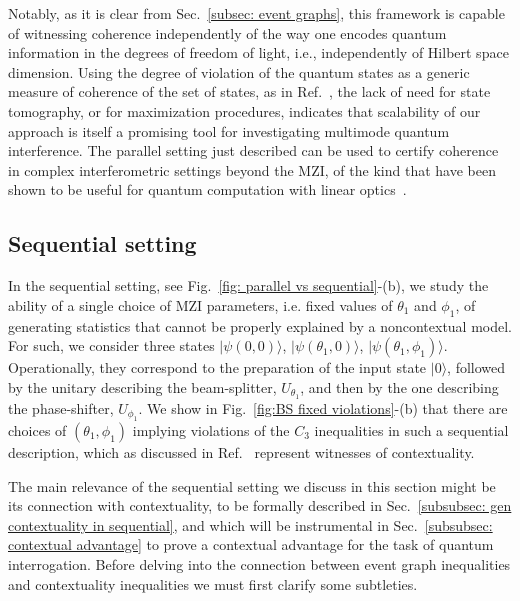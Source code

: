 \documentclass[a4paper,twocolumn,11pt,accepted=2024-01-17]{quantumarticle}
\begin{document}
Notably, as it is clear from Sec.~\ref{subsec: event graphs}, this framework is capable of witnessing coherence independently of the way one encodes quantum information in the degrees of freedom of light, i.e., independently of Hilbert space dimension. Using the degree of violation of the quantum states as a generic measure of coherence of the set of states, as in Ref.~\cite{giordani2020experimental}, the lack of need for state tomography, or for maximization procedures, indicates that scalability of our approach is itself a promising tool for investigating multimode quantum interference. { The parallel setting just described can be used to certify coherence in complex interferometric settings beyond the MZI, of the kind that have been shown to be useful for quantum computation with linear optics~\cite{taballione2021universal}.}

\subsection{Sequential setting}\label{subsec: sequential setting}

In the sequential setting, see Fig.~\ref{fig: parallel vs sequential}-(b), we study the ability of a single choice of MZI parameters, i.e. fixed values of $\theta_1$ and $\phi_1$, of generating statistics that cannot be properly explained by a noncontextual model. For such, we consider three states $\vert \psi(0,0) \rangle$, $\vert \psi(\theta_1,0)\rangle$, $\vert \psi(\theta_1,\phi_1)\rangle$. Operationally, they correspond to the preparation of the input state $\vert 0 \rangle$, followed by the unitary describing the beam-splitter, $U_{\theta_1}$, and then by the one describing the phase-shifter, $U_{\phi_1}$. We show in Fig.~\ref{fig:BS fixed violations}-(b) that there are choices of $(\theta_1,\phi_1)$ implying violations of the $C_3$ inequalities { in such a sequential description}, which as discussed in Ref.~\cite{wagner2022inequalities} represent witnesses of contextuality.

{The main relevance of the sequential setting we discuss in this section might be its connection with contextuality, to be formally described in Sec.~\ref{subsubsec: gen contextuality in sequential}, and which will be instrumental in Sec.~\ref{subsubsec: contextual advantage} to prove a contextual advantage for the task of quantum interrogation. Before delving into the connection between event graph inequalities and contextuality inequalities we must first clarify some subtleties.}
\end{document}
